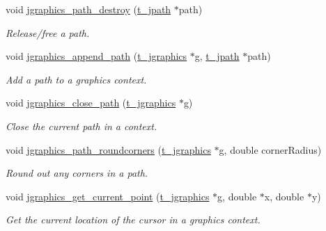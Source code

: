 \begin{DoxyCompactItemize}
void \hyperlink{group__jgraphics_gaff6abc629030d751899d99c61970df79}{jgraphics\_\-path\_\-destroy} (\hyperlink{group__jgraphics_ga09a18e946c8a6cfa25dfa38154a138d8}{t\_\-jpath} $\ast$path)
\begin{DoxyCompactList}\small\item\em Release/free a path. \item\end{DoxyCompactList}\item 
void \hyperlink{group__jgraphics_ga4e16e3a3ce6cc21374ba3d7ae4615f65}{jgraphics\_\-append\_\-path} (\hyperlink{group__jgraphics_ga4bf27bd7e21a59a427481b909d4656e7}{t\_\-jgraphics} $\ast$g, \hyperlink{group__jgraphics_ga09a18e946c8a6cfa25dfa38154a138d8}{t\_\-jpath} $\ast$path)
\begin{DoxyCompactList}\small\item\em Add a path to a graphics context. \item\end{DoxyCompactList}\item 
void \hyperlink{group__jgraphics_ga22cf905279b642358789ae7ed133808f}{jgraphics\_\-close\_\-path} (\hyperlink{group__jgraphics_ga4bf27bd7e21a59a427481b909d4656e7}{t\_\-jgraphics} $\ast$g)
\begin{DoxyCompactList}\small\item\em Close the current path in a context. \item\end{DoxyCompactList}\item 
void \hyperlink{group__jgraphics_ga51efbf384c6dd4504c9575447dbaaa53}{jgraphics\_\-path\_\-roundcorners} (\hyperlink{group__jgraphics_ga4bf27bd7e21a59a427481b909d4656e7}{t\_\-jgraphics} $\ast$g, double cornerRadius)
\begin{DoxyCompactList}\small\item\em Round out any corners in a path. \item\end{DoxyCompactList}\item 
void \hyperlink{group__jgraphics_gae3c2cc2ba52f2a27bf9e09a60fa94daa}{jgraphics\_\-get\_\-current\_\-point} (\hyperlink{group__jgraphics_ga4bf27bd7e21a59a427481b909d4656e7}{t\_\-jgraphics} $\ast$g, double $\ast$x, double $\ast$y)
\begin{DoxyCompactList}\small\item\em Get the current location of the cursor in a graphics context. \item\end{DoxyCompactList}\item 

\end{DoxyCompactItemize}

